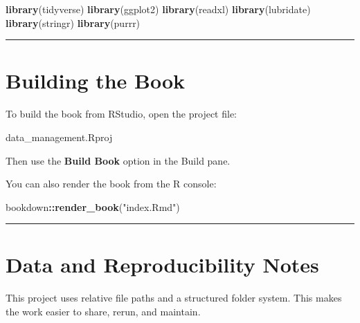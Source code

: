 \documentclass[
  11pt,
  oneside]{book}
\newenvironment{Shaded}{\begin{snugshade}}{\end{snugshade}}
\newcommand{\FunctionTok}[1]{\textcolor[rgb]{0.13,0.29,0.53}{\textbf{#1}}}
\newcommand{\NormalTok}[1]{#1}
\newcommand{\SpecialCharTok}[1]{\textcolor[rgb]{0.81,0.36,0.00}{\textbf{#1}}}
\newcommand{\StringTok}[1]{\textcolor[rgb]{0.31,0.60,0.02}{#1}}
\begin{document}
\begin{Shaded}
\begin{Highlighting}[]
\FunctionTok{library}\NormalTok{(tidyverse)}
\FunctionTok{library}\NormalTok{(ggplot2)}
\FunctionTok{library}\NormalTok{(readxl)}
\FunctionTok{library}\NormalTok{(lubridate)}
\FunctionTok{library}\NormalTok{(stringr)}
\FunctionTok{library}\NormalTok{(purrr)}
\end{Highlighting}
\end{Shaded}

\begin{center}\rule{0.5\linewidth}{0.5pt}\end{center}

\chapter*{Building the Book}\label{building-the-book}

To build the book from RStudio, open the project file:

\begin{Shaded}
\begin{Highlighting}[]
\NormalTok{data\_management.Rproj}
\end{Highlighting}
\end{Shaded}

Then use the \textbf{Build Book} option in the Build pane.

You can also render the book from the R console:

\begin{Shaded}
\begin{Highlighting}[]
\NormalTok{bookdown}\SpecialCharTok{::}\FunctionTok{render\_book}\NormalTok{(}\StringTok{"index.Rmd"}\NormalTok{)}
\end{Highlighting}
\end{Shaded}

\begin{center}\rule{0.5\linewidth}{0.5pt}\end{center}

\chapter*{Data and Reproducibility Notes}\label{data-and-reproducibility-notes}

This project uses relative file paths and a structured folder system. This makes the work easier to share, rerun, and maintain.
\end{document}
